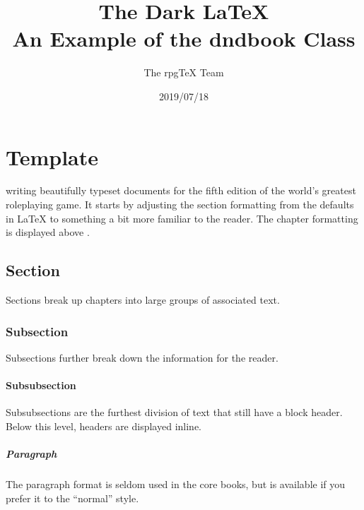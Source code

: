 \documentclass[letterpaper,twocolumn,openany,nodeprecatedcode]{dndbook}
\title{The Dark \LaTeX{} \\
\large An Example of the dndbook Class}
\author{The rpgTeX Team}
\date{2019/07/18}
\begin{document}
\frontmatter

\maketitle

\tableofcontents

%
%	
%	

\mainmatter%





\chapter{Template}

 writing beautifully typeset documents for the fifth edition of the world's greatest roleplaying game. It starts by adjusting the section formatting from the defaults in \LaTeX{} to something a bit more familiar to the reader. The chapter formatting is displayed above \cite{dnd:giocatore}.

\section{Section}
Sections break up chapters into large groups of associated text.

\subsection{Subsection}
Subsections further break down the information for the reader.

\subsubsection{Subsubsection}
Subsubsections are the furthest division of text that still have a block header. Below this level, headers are displayed inline.

\paragraph{Paragraph}
The paragraph format is seldom used in the core books, but is available if you prefer it to the ``normal'' style.
\end{document}
